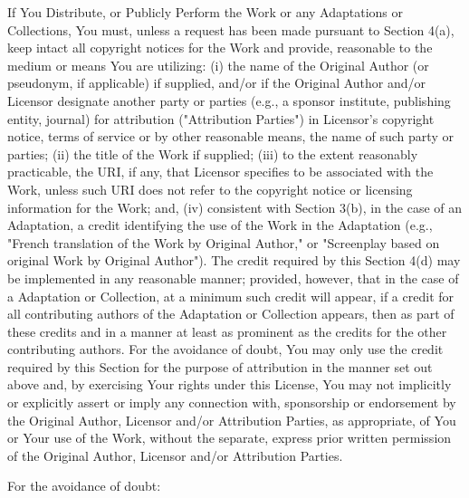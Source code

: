     \item
    If You Distribute, or Publicly Perform the Work or any Adaptations or Collections, You must, unless a request has been made pursuant to Section 4(a), keep intact all copyright notices for the Work and provide, reasonable to the medium or means You are utilizing: (i) the name of the Original Author (or pseudonym, if applicable) if supplied, and/or if the Original Author and/or Licensor designate another party or parties (e.g., a sponsor institute, publishing entity, journal) for attribution ("Attribution Parties") in Licensor's copyright notice, terms of service or by other reasonable means, the name of such party or parties; (ii) the title of the Work if supplied; (iii) to the extent reasonably practicable, the URI, if any, that Licensor specifies to be associated with the Work, unless such URI does not refer to the copyright notice or licensing information for the Work; and, (iv) consistent with Section 3(b), in the case of an Adaptation, a credit identifying the use of the Work in the Adaptation (e.g., "French translation of the Work by Original Author," or "Screenplay based on original Work by Original Author"). The credit required by this Section 4(d) may be implemented in any reasonable manner; provided, however, that in the case of a Adaptation or Collection, at a minimum such credit will appear, if a credit for all contributing authors of the Adaptation or Collection appears, then as part of these credits and in a manner at least as prominent as the credits for the other contributing authors. For the avoidance of doubt, You may only use the credit required by this Section for the purpose of attribution in the manner set out above and, by exercising Your rights under this License, You may not implicitly or explicitly assert or imply any connection with, sponsorship or endorsement by the Original Author, Licensor and/or Attribution Parties, as appropriate, of You or Your use of the Work, without the separate, express prior written permission of the Original Author, Licensor and/or Attribution Parties.

    \item
    For the avoidance of doubt:

